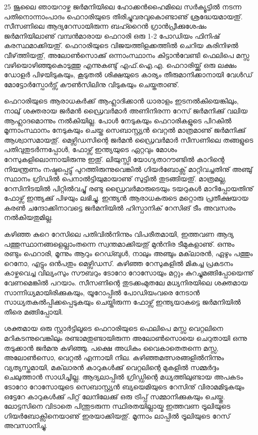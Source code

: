 ﻿
\vskip 2pt

25 ജൂലൈ ഞായറാഴ്ച ജര്‍മനിയിലെ ഹോക്കന്‍ഹൈമിലെ സര്‍ക്യൂട്ടില്‍ നടന്ന പതിനൊന്നാംപാദം ഫെറാരിയുടെ 
തിരിച്ചുവരവുകൊണ്ടാണു് ശ്രദ്ധേയമായതു്. സീസണിലെ ആദ്യറേസായിരുന്ന ബഹ്റൈന്‍ ഗ്രാന്‍പ്രീക്കുശേഷം 
ജര്‍മനിയിലാണു് വമ്പന്‍മാരായ ഫെറാരി ഒരു 1-2 പോഡിയം ഫിനിഷ് കരസ്ഥമാക്കിയതു്. ഫെറാരിയുടെ 
വിജയത്തിളക്കത്തില്‍ ചെറിയ കരിനിഴല്‍ വീഴ്‌ത്തിയതു്, അലോണ്‍സൊക്കു് ഒന്നാംസ്ഥാനം കിട്ടാന്‍വേണ്ടി ഫെലിപെ 
മസ്സ വഴിയൊഴിഞ്ഞുകൊടുത്തു എന്നുകണ്ടു് എഫ്.ഐ.എ. ഫെറാരിയ്ക്കു് ഒരു ലക്ഷം ഡോളര്‍ പിഴയിടുകയും, കൂടുതല്‍ 
ശിക്ഷയുടെ കാര്യം തീരുമാനിക്കാനായി വേള്‍ഡ് മോട്ടോര്‍സ്പോര്‍ട്സ് കൗണ്‍സിലിനു വിടുകയും ചെയ്തതാണു്.

ഫെറാരിയുടെ ആരാധകര്‍ക്ക് ആഹ്ലാദിക്കാന്‍ ധാരാളം ഇടനല്‍കിയെങ്കിലും, നാലു് ശക്തരായ ജര്‍മന്‍ ഡ്രൈവര്‍മാര്‍ 
അണിനിരന്ന റേസ് ജര്‍മനിക്കു് വലിയ ആഹ്ലാദമൊന്നും നല്‍കിയില്ല. പോള്‍ നേടുകയും ഫെറാരികളുടെ പിറകില്‍ 
മൂന്നാംസ്ഥാനം നേടുകയും ചെയ്ത സെബാസ്റ്റ്യന്‍ വെറ്റല്‍ മാത്രമാണു് ജര്‍മനിക്കു് ആശ്വാസമായതു്. മെഴ്സിഡസിന്റെ 
ജര്‍മന്‍ ഡ്രൈവര്‍മാര്‍ സീസണിലെ തങ്ങളുടെ പതിവുതുടര്‍ന്നപ്പോള്‍, ഫോഴ്സ് ഇന്ത്യയുടെ ഏറ്റവും മോശം 
റേസുകളിലൊന്നായിരുന്നു ഇതു്. ലിയുസ്സി യോഗ്യതാറൗണ്ടില്‍ കാറിന്റെ നിയന്ത്രണം നഷ്ടപ്പെട്ടു് പുറത്തിരുന്നുവെങ്കില്‍ 
ഗിയര്‍ബോക്സ് മാറ്റിവച്ചതിനു് അഞ്ചു് സ്ഥാനം ഗ്രിഡില്‍ പെനാല്‍ട്ടിയുമായാണു് സുട്ടില്‍ തുടങ്ങിയതു്. മാത്രമല്ല, 
റേസിനിടയില്‍ പിറ്റില്‍വച്ചു് രണ്ടു ഡ്രൈവര്‍മാരുടെയും ടയറുകള്‍ മാറിപ്പോയതിനു് ഫോഴ്സ് ഇന്ത്യക്കു് പിഴയും ലഭിച്ചു. 
ഇന്ത്യന്‍ ആരാധകരുടെ മറ്റൊരു പ്രതീക്ഷയായ കരണ്‍ ചന്ദോക്കിനാവട്ടെ ജര്‍മനിയില്‍ ഹിസ്പാനിക് റേസിങ് ടീം 
അവസരം നല്‍കിയതുമില്ല.

കഴിഞ്ഞ കുറെ റേസിലെ പതിവില്‍നിന്നും വിപരീതമായി, ഇത്തവണ ആദ്യ പത്തുസ്ഥാനങ്ങളെല്ലാംതന്നെ 
സ്വന്തമാക്കിയതു് മുന്‍നിര ടീമുകളാണു്. ഒന്നും രണ്ടും ഫെറാരി, മൂന്നും ആറും റെഡ്ബുള്‍, നാലും അഞ്ചും മക്‌ലാരന്‍, ഏഴും 
പത്തും റെനോ, എട്ടും ഒന്‍പതും മെഴ്സിഡസ്. കഴിഞ്ഞ റേസുകളില്‍ മികച്ച പ്രകടനം കാഴ്ചവെച്ച വില്യംസും സൗബറും 
ടോറോ റോസോയും മറ്റും കുറച്ചുമങ്ങിപ്പോയെന്നു് വേണമെങ്കില്‍ പറയാം. സീസണിന്റെ തുടക്കംമുതലേ മധ്യനിരയിലെ 
ശക്തമായ സാന്നിധ്യമായിരിക്കുകയും, യൂറോപ്പില്‍ പോഡിയംവരെ നേടാന്‍ സാധ്യതകല്‍പ്പിക്കപ്പെടുകയും ചെയ്തിരുന്ന 
ഫോഴ്സ് ഇന്ത്യയാകട്ടെ ജര്‍മനിയില്‍ തീരെ മങ്ങിപ്പോയി.

ശക്തമായ ഒരു സ്റ്റാര്‍ട്ടിലൂടെ ഫെറാരിയുടെ ഫെലിപെ മസ്സ വെറ്റലിനെ മറികടന്നുവെങ്കിലും രണ്ടാമതുണ്ടായിരുന്ന 
അലോണ്‍സൊയെ ചെറുതായി ഒന്നു തടുക്കാന്‍ ജര്‍മനു കഴിഞ്ഞു. പക്ഷെ അധികം വൈകാതെതന്നെ മസ്സ, 
അലോണ്‍സൊ, വെറ്റല്‍ എന്നായി നില. കഴിഞ്ഞമത്സരങ്ങളില്‍നിന്നും വ്യത്യസ്തമായി, മക്‌ലാരന്‍ കാറുകള്‍ക്കു് വെറ്റലിന്റെ 
മുകളില്‍ സമ്മര്‍ദ്ദം ചെലുത്താന്‍ സാധിച്ചില്ല. ആദ്യലാപ്പില്‍ ഗ്രിഡ്ഡിന്റെ മധ്യത്തിലുണ്ടായ അപകടം ടോറോ റോസോയുടെ 
സെബാസ്റ്റ്യന്‍ ബ്യയെമിയുടെ റേസിനു് വിരാമമിടുകയും ഒട്ടേറേ കാറുകള്‍ക്കു് പിറ്റ് ലേനിലേക്കു് ഒരു ട്രിപ്പ് സമ്മാനിക്കുകയും 
ചെയ്തു. ലോട്ടസിനെ വിടാതെ പിന്തുടരുന്ന സ്ഥിരതയില്ലായ്മ ഇത്തവണ ട്രൂലിയുടെ ഗിയര്‍ബോക്സിനെയാണു് ഇരയാക്കിയതു്. 
മൂന്നാം ലാപ്പില്‍ ട്രൂലിയുടെ റേസ് അവസാനിച്ചു.

